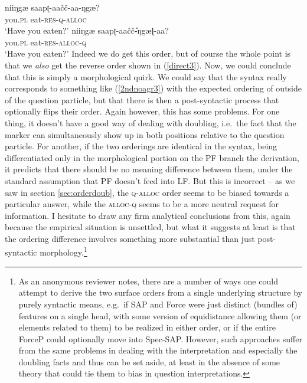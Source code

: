 \documentclass[output=paper, modfonts, nonflat]{langsci/langscibook}
\begin{document}
\ea
 \ea\label{2ndnoagr3}\gll niiŋgæ{} saapʈ-aa\v{c}\v{c}-aa-ŋgæ?\\
 you.\textsc{pl}{} eat-\textsc{res}-\textsc{q}-\textsc{alloc}\\
 \glt `Have you eaten?'
 \ex\label{direct3}\gll niiŋgæ{} saapʈ-aa\v{c}\v{c}\U-ŋgæɭ-aa?\\
 you.\textsc{pl}{} eat-\textsc{res}-\textsc{alloc}-\textsc{q}\\ 
 \glt `Have you eaten?' 
 \z
\z
%
Indeed we do get this order, but of course the whole point is that we
\emph{also} get the reverse order shown in (\ref{direct3}). Now, we
could conclude that this is simply a morphological quirk. We could say
that the syntax really corresponds to something like (\ref{2ndnoagr3})
with the expected ordering of \allagr{} outside of the question
particle, but that there is then a post-syntactic process that
optionally flips their order.  Again however, this has some
problems. For one thing, it doesn't have a good way of dealing with
doubling, i.e.\ the fact that the \allagr{} marker can simultaneously
show up in both positions relative to the question particle. For
another, if the two orderings are identical in the syntax, being
differentiated only in the morphological portion on the PF branch the
derivation, it predicts that there should be no meaning difference
between them, under the standard assumption that PF doesn't feed into
LF. But this is incorrect -- as we saw in section
\ref{sec:orderdoub}, the \textsc{q}-\textsc{alloc}{} order seems to be biased
towards a particular answer, while the \textsc{alloc}{}-\textsc{q} seems to be
a more neutral request for information. I hesitate to draw any firm
analytical conclusions from this, again because the empirical
situation is unsettled, but what it suggests at least is that the
ordering difference involves something more substantial than just
post-syntactic morphology.\footnote{As an anonymous reviewer notes,
  there are a number of ways one could attempt to derive the two
  surface orders from a single underlying structure by purely
  syntactic means, e.g.\ if SAP and Force were just distinct (bundles
  of) features on a single head, with some version of equidistance
  allowing them (or elements related to them) to be realized in either
  order, or if the entire ForceP could optionally move into
  Spec-SAP. However, such approaches suffer from the same problems in
  dealing with the interpretation and especially the doubling facts
  and thus can be set aside, at least in the absence of some theory
  that could tie them to bias in question interpretations.}
\end{document}
